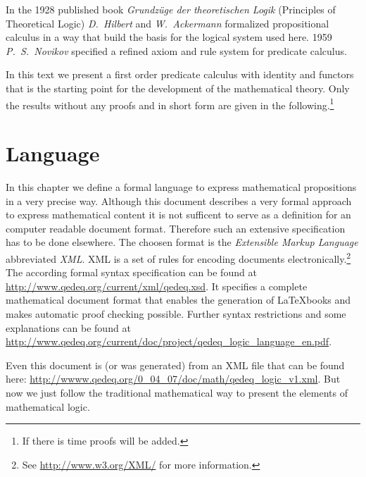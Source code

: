 \documentclass[a4paper,german,10pt,twoside]{book}
\theoremstyle{definition}
\theoremstyle{remark}
\begin{document}
\par
In the 1928 published book \emph{Grundz{\"u}ge der theoretischen Logik} (Principles of Theoretical Logic) \emph{D.~Hilbert} and \emph{W.~Ackermann} formalized propositional calculus in a way that build the basis for the logical system used here. 1959 \emph{P.~S.~Novikov} specified a refined axiom and rule system for predicate calculus.

\par
In this text we present a first order predicate calculus with identity and functors that is the starting point for the development of the mathematical theory. Only the results without any proofs and in short form are given in the following.\footnote{If there is time proofs will be added.}


\chapter{Language} \label{chapter4} \hypertarget{chapter4}{}

In this chapter we define a formal language to express mathematical propositions in a very precise way. Although this document describes a very formal approach to express mathematical content it is not sufficent to serve as a definition for an computer readable document format. Therefore such an extensive specification has to be done elsewhere. The choosen format is the \emph{Extensible Markup Language} abbreviated \emph{XML}. XML is a set of rules for encoding documents electronically.\footnote{See \url{http://www.w3.org/XML/} for more information.}
The according formal syntax specification can be found at \url{http://www.qedeq.org/current/xml/qedeq.xsd}.
It specifies a complete mathematical document format that enables the generation of \LaTeX books and makes automatic proof checking possible. 
Further syntax restrictions and some explanations can be found at \url{http://www.qedeq.org/current/doc/project/qedeq_logic_language_en.pdf}.

\par          
Even this document is (or was generated) from an XML file that can be found here: \url{http://wwww.qedeq.org/0_04_07/doc/math/qedeq_logic_v1.xml}.
But now we just follow the traditional mathematical way to present the elements of mathematical logic.
\end{document}
